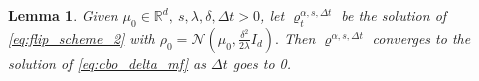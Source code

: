\documentclass[reqno]{amsart}
\numberwithin{algorithm}{section}
\newcommand{\R}{\mathbb{R}}
\newcommand{\Xalpha}{{X^\alpha}}
\newtheorem{lemma}[theorem]{Lemma}
\begin{document}
{%
\begin{lemma}\label{lemma:CFtodelta_N}
    Given $\mu_0\in\R^d,\ s,\lambda,\delta,\Delta t>0$, let $\varrho_t^{\alpha,s,\Delta t}$ be the solution of \eqref{eq:flip_scheme_2} with $\rho_0=\mathcal N\left(\mu_0,\frac{\delta^2}{2\lambda}I_d\right).$
    Then $\varrho^{\alpha,s,\Delta t}$ converges to the solution of \eqref{eq:cbo_delta_mf} as $\Delta t$ goes to 0.
    

\end{lemma}}
\end{document}

